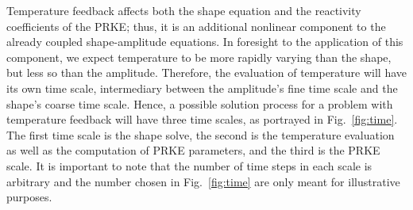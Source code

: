 \documentclass{elsarticle}
\newcommand{\fig}[1]{Fig.~\ref{#1}}                      %
\begin{document}
Temperature feedback affects both the shape equation and the reactivity coefficients of the PRKE; thus, 
it is an additional nonlinear component to the already coupled shape-amplitude equations. In foresight to 
the application of this component, we expect temperature to be more rapidly varying than the shape, but 
less so than the amplitude.  Therefore, the evaluation of temperature will have its own time scale, intermediary
between the amplitude's fine time scale and the shape's coarse time scale.  
Hence, a possible solution process for a problem with temperature feedback will have three time scales, as
portrayed in \fig{fig:time}.  The first time scale is the shape solve, the second is the temperature evaluation 
as well as the computation of PRKE parameters, and the third is the PRKE scale.  It is important to note that the 
number of time steps in each scale is arbitrary and the number chosen in \fig{fig:time} are only meant for 
illustrative purposes.
\end{document}
